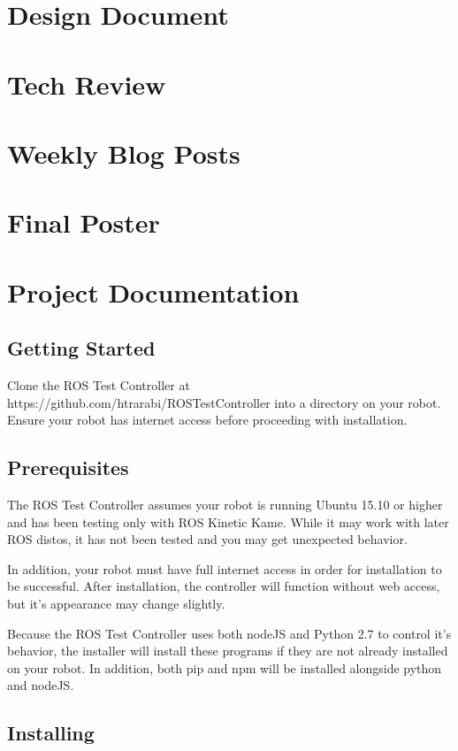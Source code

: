 \documentclass[onecolumn, draftclsnofoot,10pt, compsoc]{report}
\begin{document}
\chapter*{Design Document}
\chapter*{Tech Review}
\chapter*{Weekly Blog Posts}
\chapter*{Final Poster}
\chapter{Project Documentation}

\minitoc
\section{Getting Started}


Clone the ROS Test Controller at https://github.com/htrarabi/ROSTestController into a directory on your robot. Ensure your robot has internet access before proceeding with installation.

\section{Prerequisites}

The ROS Test Controller assumes your robot is running Ubuntu 15.10 or higher and has been testing only with ROS Kinetic Kame. While it may work with later ROS distos, it has not been tested and you may get unexpected behavior.

In addition, your robot must have full internet access in order for installation to be successful. After installation, the controller will function without web access, but it's appearance may change slightly.

Because the ROS Test Controller uses both nodeJS and Python 2.7 to control it's behavior, the installer will install these programs if they are not already installed on your robot. In addition, both pip and npm will be installed alongside python and nodeJS.
\section{Installing}
\end{document}
